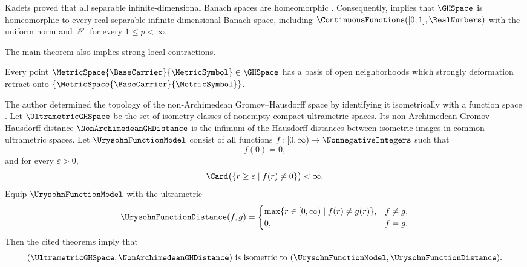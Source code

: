 \begin{remark}\label{rem:banach-homeomorphism}
Kadets proved that all separable infinite-dimensional Banach spaces are
homeomorphic \cite[Theorem]{Kadets1967}.
Consequently,
 implies that
$\GHSpace$
is homeomorphic to every real separable infinite-dimensional Banach space,
including
$\ContinuousFunctions([0,1],\RealNumbers)$
with the uniform norm and
$\ell^p$
for every
$1\leq p<\infty$.
\end{remark}

The main theorem also implies strong local contractions.

\begin{corollary}\label{cor:strong-local-contractions}
Every point
$\MetricSpace{\BaseCarrier }{\MetricSymbol }\in \GHSpace$
has a basis of open neighborhoods which strongly deformation retract
onto
$\{\MetricSpace{\BaseCarrier }{\MetricSymbol }\}$.
\end{corollary}

\begin{remark}\label{rem:nonarchimedean-gh}
The author determined the topology of the non-Archimedean
Gromov--Hausdorff space by identifying it isometrically with a function space
\cite[Theorems~1.1 and~1.3(3)--(4)]{Ishiki2024NonseparableUrysohn}.
Let
$\UltrametricGHSpace$
be the set of isometry classes of nonempty compact ultrametric spaces.
Its non-Archimedean Gromov--Hausdorff distance
$\NonArchimedeanGHDistance$
is the infimum of the Hausdorff distances between isometric images
in common ultrametric spaces.
Let
$\UrysohnFunctionModel$
consist of all functions
$f\colon[0,\infty)\to\NonnegativeIntegers$
such that
\[
 f(0)=0,
\]
and for every
$\varepsilon>0$,
\[
 \Card\bigl(\{r\geq\varepsilon\mid f(r)\ne0\}\bigr)<\infty.
\]
Equip
$\UrysohnFunctionModel$
with the ultrametric
\[
 \UrysohnFunctionDistance(f,g)
 =
 \begin{cases}
  \max\{r\in[0,\infty)\mid f(r)\ne g(r)\},&f\ne g,\\
  0,&f=g.
 \end{cases}
\]
Then the cited theorems imply that
\[
 (\UltrametricGHSpace,\NonArchimedeanGHDistance)
 \text{ is isometric to }
 (\UrysohnFunctionModel,\UrysohnFunctionDistance).
\]
\end{remark}
